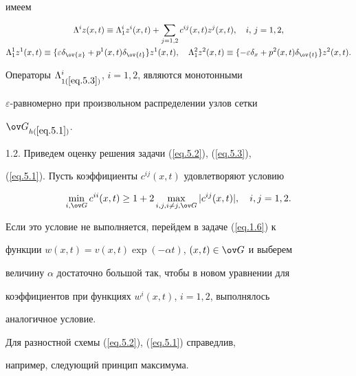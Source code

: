 имеем


\begin{gather}


\label{eq.5.3}


\Lambda^i z(x, t)\equiv \Lambda_1^i z^i(x, t)+\sum_{j=1, 2} c^{ij}(x, t)


z^j(x, t), \quad i,\, j=1, 2,\\


%


\Lambda^1_1 z^1(x, t)\equiv \{\varepsilon \delta_{\ov{x}}+p^1(x,


t) \delta_{\ov{t}}\} z^1(x, t),\quad


\Lambda^2_1 z^2(x, t)\equiv \{-\varepsilon \delta_x+p^2(x, t)


\delta_{\ov{t}}\} z^2(x, t).\notag


\end{gather}





Операторы $\Lambda^i_{1(\ref{eq.5.3})}$, $i=1, 2$, являются монотонными


$\varepsilon$-равномерно при произвольном распределении узлов сетки


$\ov G_{h(\ref{eq.5.1})}$.





1.2. Приведем оценку решения задачи (\ref{eq.5.2}), (\ref{eq.5.3}),


(\ref{eq.5.1}). Пусть коэффициенты $c^{ij}(x, t)$ удовлетворяют условию


$$


\min_{i, \ov G} c^{ii}(x, t)\ge 1+2 \max_{i, j, i\ne j,


\ov G} |c^{ij}(x, t)|, \quad i, j=1, 2.


$$


Если это условие не выполняется, перейдем в задаче (\ref{eq.1.6}) к


функции $w(x, t)=v(x, t)\exp(-\alpha t)$, $(x, t)\in \ov G$ и выберем


величину $\alpha$ достаточно большой так, чтобы в новом уравнении для


коэффициентов при функциях $w^i(x, t)$, $i=1, 2$, выполнялось


аналогичное условие.





Для разностной схемы (\ref{eq.5.2}), (\ref{eq.5.1}) справедлив,


например, следующий принцип максимума.





